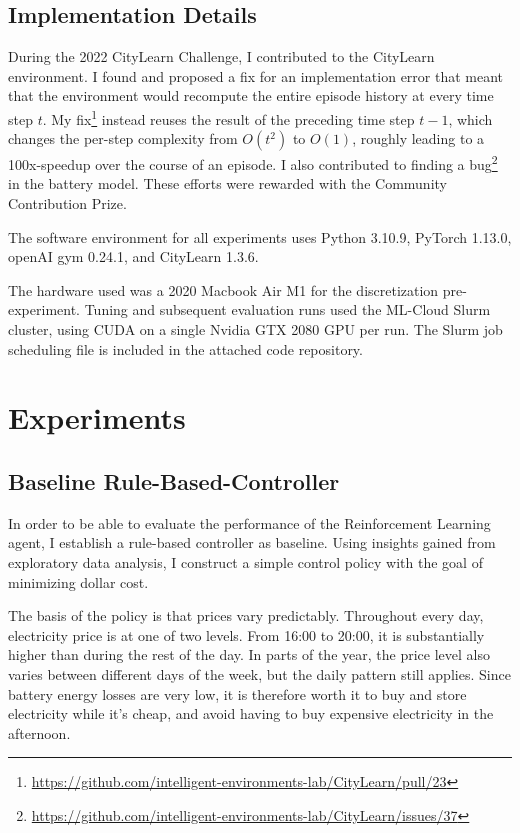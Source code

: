 \subsection{Implementation Details}
During the 2022 CityLearn Challenge, I contributed to the CityLearn environment.
I found and proposed a fix for an implementation error that meant that the environment would recompute the entire episode history at every time step $t$.
My fix\footnote{\url{https://github.com/intelligent-environments-lab/CityLearn/pull/23}} instead reuses the result of the preceding time step $t-1$, which changes the per-step complexity from $O(t^2)$ to $O(1)$, roughly leading to a 100x-speedup over the course of an episode.
I also contributed to finding a bug\footnote{\url{https://github.com/intelligent-environments-lab/CityLearn/issues/37}} in the battery model.
These efforts were rewarded with the Community Contribution Prize.

The software environment for all experiments uses Python 3.10.9, PyTorch 1.13.0, openAI gym 0.24.1, and CityLearn 1.3.6.

The hardware used was a 2020 Macbook Air M1 for the discretization pre-experiment. Tuning and subsequent evaluation runs used the ML-Cloud Slurm cluster, using CUDA on a single Nvidia GTX 2080 GPU per run. The Slurm job scheduling file is included in the attached code repository.

\section{Experiments} %
\subsection{Baseline Rule-Based-Controller}
In order to be able to evaluate the performance of the Reinforcement Learning agent, I establish a rule-based controller as baseline.
Using insights gained from exploratory data analysis, I construct a simple control policy with the goal of minimizing dollar cost.

The basis of the policy is that prices vary predictably.
Throughout every day, electricity price is at one of two levels.
From 16:00 to 20:00, it is substantially higher than during the rest of the day.
In parts of the year, the price level also varies between different days of the week, but the daily pattern still applies.
Since battery energy losses are very low, it is therefore worth it to buy and store electricity while it's cheap, and avoid having to buy expensive electricity in the afternoon.

